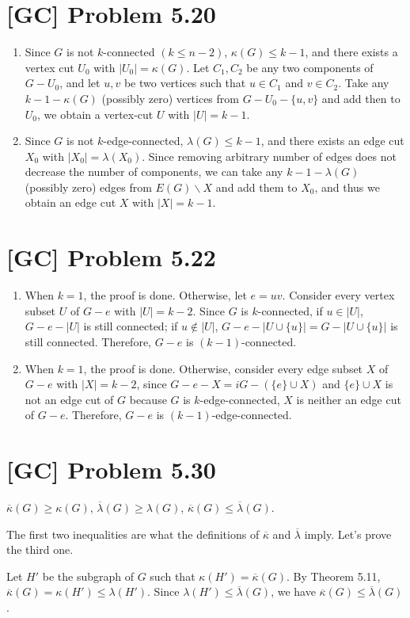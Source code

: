 \documentclass[a4paper,11pt,twocolumn]{article}
\begin{document}
  \section{[GC] Problem 5.20}
  \begin{enumerate}
    \item Since $G$ is not $k$-connected $(k \leq n-2)$, $\kappa(G) \leq k-1$, and there exists a vertex cut $U_0$ with $|U_0| = \kappa(G)$. Let $C_1, C_2$ be any two components of $G - U_0$, and let $u, v$ be two vertices such that $u \in C_1$ and $v \in C_2$. Take any $k - 1 - \kappa(G)$ (possibly zero) vertices from $G - U_0 - \{u, v\}$ and add then to $U_0$, we obtain a vertex-cut $U$ with $|U| = k-1$.
    \item Since $G$ is not $k$-edge-connected, $\lambda(G) \leq k-1$, and there exists an edge cut $X_0$ with $|X_0| = \lambda(X_0)$. Since removing arbitrary number of edges does not decrease the number of components, we can take any $k-1-\lambda(G)$ (possibly zero) edges from $E(G) \backslash X$ and add them to $X_0$, and thus we obtain an edge cut $X$ with $|X| = k-1$.
  \end{enumerate}

  \section{[GC] Problem 5.22}
  \begin{enumerate}
    \item When $k = 1$, the proof is done. Otherwise, let $e = uv$. Consider every vertex subset $U$ of $G - e$ with $|U| = k-2$. Since $G$ is $k$-connected, if $u \in |U|$, $G - e - |U|$ is still connected; if $u \notin |U|$, $G - e - |U \cup \{u\}| = G - |U \cup \{u\}|$ is still connected. Therefore, $G-e$ is $(k-1)$-connected.
    \item When $k = 1$, the proof is done. Otherwise, consider every edge subset $X$ of $G-e$ with $|X| = k-2$, since $G-e-X =i G-(\{e\} \cup X)$ and $\{e\} \cup X$ is not an edge cut of $G$ because $G$ is $k$-edge-connected, $X$ is neither an edge cut of $G-e$. Therefore, $G-e$ is $(k-1)$-edge-connected.
  \end{enumerate}

  \section{[GC] Problem 5.30}
  $\overline{\kappa}(G) \geq \kappa(G)$, $\overline{\lambda}(G) \geq \lambda(G)$, $\overline{\kappa}(G) \leq \overline{\lambda}(G)$. \par
  The first two inequalities are what the definitions of $\overline{\kappa}$ and $\overline{\lambda}$ imply. Let's prove the third one. \par
  Let $H'$ be the subgraph of $G$ such that $\kappa(H') = \overline{\kappa}(G)$. By Theorem 5.11, $\overline{\kappa}(G) = \kappa(H') \leq \lambda(H')$. Since $\lambda(H') \leq \overline{\lambda}(G)$, we have $\overline{\kappa}(G) \leq \overline{\lambda}(G)$.
\end{document}
